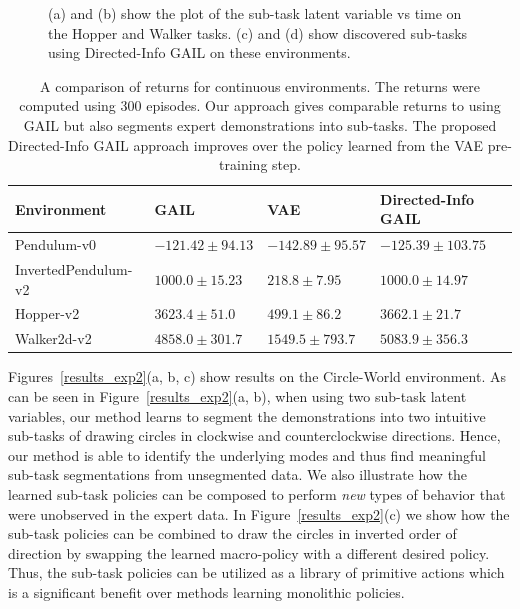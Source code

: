 \documentclass{article} %
\begin{document}
\begin{figure}[tb]
    \caption{(a) and (b) show the plot of the sub-task latent variable vs time on the Hopper and Walker tasks. (c) and (d) show discovered sub-tasks using Directed-Info GAIL on these environments.}
    \label{fig:hopper_walker}
    \vspace{-0.3cm}
\end{figure}

\begin{table}[]
\centering
\begin{tabular}{@{}llll@{}}
\toprule
 Environment & GAIL \citep{ho2016generative} & VAE & Directed-Info GAIL \\ \midrule
 Pendulum-v0 & $\mathbf{-121.42 \pm 94.13}$ & $-142.89 \pm 95.57$  & $-125.39 \pm 103.75$ \\
 InvertedPendulum-v2 & $1000.0 \pm 15.23$ & $ 218.8 \pm 7.95 $ & $\mathbf{1000.0 \pm 14.97}$ \\
 Hopper-v2 & $3623.4 \pm 51.0 $ & $499.1 \pm 86.2$ & $\mathbf{3662.1 \pm 21.7}$ \\
 Walker2d-v2 & $4858.0 \pm 301.7$ & $1549.5 \pm 793.7 $ & $\mathbf{5083.9 \pm 356.3}$ \\
 \bottomrule
\end{tabular}
\caption{A comparison of returns for continuous environments. The returns were computed using 300 episodes. Our approach gives comparable returns to using GAIL but also segments expert demonstrations into sub-tasks. The proposed Directed-Info GAIL approach improves over the policy learned from the VAE pre-training step.}
\label{table:reward_results}
\vspace{-0.2cm}
\end{table}

Figures~\ref{results_exp2}(a, b, c) show results on the Circle-World environment. As can be seen in Figure~\ref{results_exp2}(a, b), when using two sub-task latent variables, our method learns to segment the demonstrations into two intuitive sub-tasks of drawing circles in clockwise and counterclockwise directions.
Hence, our method is able to identify the underlying modes and thus find meaningful sub-task segmentations from unsegmented data.
We also illustrate how the learned sub-task policies can be composed to perform \emph{new} types of behavior that were unobserved in the expert data. In Figure~\ref{results_exp2}(c) we show how the sub-task policies can be combined to draw the circles in inverted order of direction by swapping the learned macro-policy with a different desired policy. Thus, the sub-task policies can be utilized as a library of primitive actions which is a significant benefit over methods learning monolithic policies. 
\end{document}
